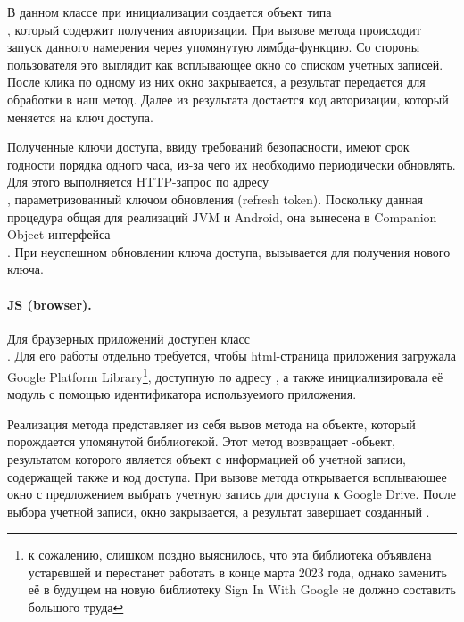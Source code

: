     В данном классе при инициализации создается объект типа\\ , который содержит  получения авторизации. При вызове метода  происходит запуск данного намерения через упомянутую лямбда-функцию. Со стороны пользователя это выглядит как всплывающее окно со списком учетных записей. После клика по одному из них окно закрывается, а результат передается для обработки в наш метод. Далее из результата достается код авторизации, который меняется на ключ доступа.

    Полученные ключи доступа, ввиду требований безопасности, имеют срок годности порядка одного часа, из-за чего их необходимо периодически обновлять. Для этого выполняется HTTP-запрос по адресу\\ , параметризованный ключом обновления (refresh token). Поскольку данная процедура общая для реализаций JVM и Android, она вынесена в Companion Object интерфейса\\ . При неуспешном обновлении ключа доступа, вызывается  для получения нового ключа.
    
    \paragraph{JS (browser).} Для браузерных приложений доступен класс\\ . Для его работы отдельно требуется, чтобы html-страница приложения загружала Google Platform Library\footnote{к сожалению, слишком поздно выяснилось, что эта библиотека объявлена устаревшей и перестанет работать в конце марта 2023 года, однако заменить её в будущем на новую библиотеку Sign In With Google не должно составить большого труда}, доступную по адресу , а также инициализировала её модуль  с помощью идентификатора используемого приложения. 

    Реализация метода  представляет из себя вызов метода  на объекте, который порождается упомянутой библиотекой. Этот метод возвращает -объект\cite{js-promise}, результатом которого является объект с информацией об учетной записи, содержащей также и код доступа. При вызове метода  открывается всплывающее окно с предложением выбрать учетную запись для доступа к Google Drive. После выбора учетной записи, окно закрывается, а результат завершает созданный .

